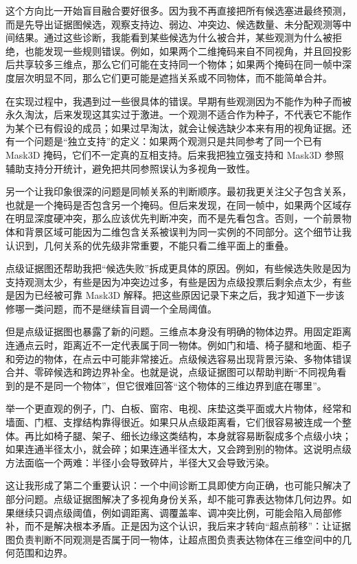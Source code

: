 \documentclass[UTF8,a4paper,12pt]{ctexart}
\begin{document}
这个方向比一开始盲目融合要好很多。因为我不再直接把所有候选塞进最终预测，而是先导出证据图候选，观察支持边、弱边、冲突边、候选数量、未分配观测等中间结果。通过这些诊断，我能看到某些候选为什么被合并，某些观测为什么被拒绝，也能发现一些规则错误。例如，如果两个二维掩码来自不同视角，并且回投影后共享较多三维点，那么它们可能在支持同一个物体；如果两个掩码在同一帧中深度层次明显不同，那么它们更可能是遮挡关系或不同物体，而不能简单合并。

在实现过程中，我遇到过一些很具体的错误。早期有些观测因为不能作为种子而被永久淘汰，后来发现这其实过于激进。一个观测不适合作为种子，不代表它不能作为某个已有假设的成员；如果过早淘汰，就会让候选缺少本来有用的视角证据。还有一个问题是“独立支持”的定义：如果两个观测只是共同参考了同一个已有 Mask3D 掩码，它们不一定真的互相支持。后来我把独立强支持和 Mask3D 参照辅助支持分开统计，避免把共同参照误认为多视角一致性。

另一个让我印象很深的问题是同帧关系的判断顺序。最初我更关注父子包含关系，也就是一个掩码是否包含另一个掩码。但后来发现，在同一帧中，如果两个区域存在明显深度硬冲突，那么应该优先判断冲突，而不是先看包含。否则，一个前景物体和背景区域可能因为二维包含关系被误判为同一实例的不同部分。这个细节让我认识到，几何关系的优先级非常重要，不能只看二维平面上的重叠。

点级证据图还帮助我把“候选失败”拆成更具体的原因。例如，有些候选失败是因为支持观测太少，有些是因为冲突边过多，有些是因为点级投票后剩余点太少，有些是因为已经被可靠 Mask3D 解释。把这些原因记录下来之后，我才知道下一步该修哪一类问题，而不是继续盲目调一个全局阈值。

但是点级证据图也暴露了新的问题。三维点本身没有明确的物体边界。用固定距离连通点云时，距离近不一定代表属于同一物体。例如门和墙、椅子腿和地面、柜子和旁边的物体，在点云中可能非常接近。点级候选容易出现背景污染、多物体错误合并、零碎候选和跨边界补全。也就是说，点级证据图可以帮助判断“不同视角看到的是不是同一个物体”，但它很难回答“这个物体的三维边界到底在哪里”。

举一个更直观的例子，门、白板、窗帘、电视、床垫这类平面或大片物体，经常和墙面、门框、支撑结构靠得很近。如果只从点级距离看，它们很容易被连成一个整体。再比如椅子腿、架子、细长边缘这类结构，本身就容易断裂成多个点级小块；如果连通半径太小，就会碎；如果连通半径太大，又会跨到别的物体。这说明点级方法面临一个两难：半径小会导致碎片，半径大又会导致污染。

这让我形成了第二个重要认识：一个中间诊断工具即使方向正确，也可能只解决了部分问题。点级证据图解决了多视角身份关系，却不能可靠表达物体几何边界。如果继续只调点级阈值，例如调距离、调覆盖率、调冲突比例，可能会陷入局部修补，而不是解决根本矛盾。正是因为这个认识，我后来才转向“超点前移”：让证据图负责判断不同观测是否属于同一物体，让超点图负责表达物体在三维空间中的几何范围和边界。
\end{document}
